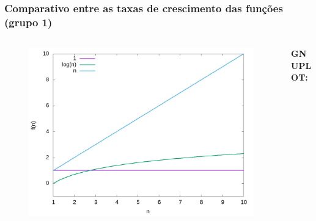 \documentclass[aspectratio=169]{beamer}
\begin{document}
\begin{frame}\frametitle{Comparativo entre as taxas de crescimento das funções (grupo 1)}
\vspace{-5mm}
\begin{columns}[T]
\begin{column}{0.5\linewidth}
\begin{figure}[h]
	\centering
	\includegraphics[height=0.65\paperheight]{graficos/grupo1.jpg}
\end{figure}
\end{column}
\begin{column}{0.5\linewidth}
\vspace{5mm}
{\fontsize{0}{4}\selectfont{}\textbf{GNUPLOT:}

}
\end{column}
\end{columns}
\end{frame}
\end{document}
